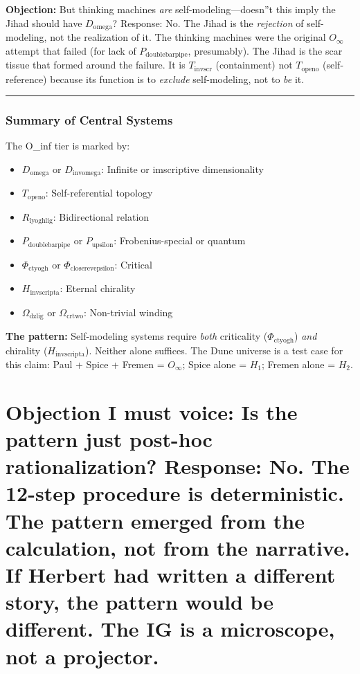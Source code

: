 \documentclass[12pt,a4paper]{article}
\begin{document}
\textbf{Objection:} But thinking machines \emph{are} self-modeling---doesn''t this imply the Jihad should have $D_{\text{omega}}$? Response: No. The Jihad is the \emph{rejection} of self-modeling, not the realization of it. The thinking machines were the original $O_{\infty}$ attempt that failed (for lack of $P_{\text{doublebarpipe}}$, presumably). The Jihad is the scar tissue that formed around the failure. It is $T_{\text{invscr}}$ (containment) not $T_{\text{openo}}$ (self-reference) because its function is to \emph{exclude} self-modeling, not to \emph{be} it.

\begin{center}
\rule{0.5\textwidth}{0.4pt}
\end{center}

\section{Summary of Central Systems}

The O\_inf tier is marked by:

\begin{itemize}
    \item $D_{\text{omega}}$ or $D_{\text{invomega}}$: Infinite or imscriptive dimensionality
    \item $T_{\text{openo}}$: Self-referential topology
    \item $R_{\text{lyoghlig}}$: Bidirectional relation
    \item $P_{\text{doublebarpipe}}$ or $P_{\text{upsilon}}$: Frobenius-special or quantum
    \item $\Phi_{\text{ctyogh}}$ or $\Phi_{\text{closerevepsilon}}$: Critical
    \item $H_{\text{invscripta}}$: Eternal chirality
    \item $\Omega_{\text{dzlig}}$ or $\Omega_{\text{crtwo}}$: Non-trivial winding
\end{itemize}

\textbf{The pattern:} Self-modeling systems require \emph{both} criticality ($\Phi_{\text{ctyogh}}$) \emph{and} chirality ($H_{\text{invscripta}}$). Neither alone suffices. The Dune universe is a test case for this claim: Paul + Spice + Fremen = $O_{\infty}$; Spice alone = $H_1$; Fremen alone = $H_2$.

\part{\textbf{Objection I must voice:} Is the pattern just post-hoc rationalization? Response: No. The 12-step procedure is deterministic. The pattern emerged from the calculation, not from the narrative. If Herbert had written a different story, the pattern would be different. The IG is a microscope, not a projector.}
\end{document}
